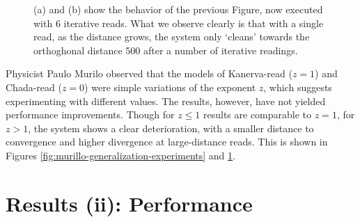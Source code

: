 \begin{figure}[h!]
  \centering


  \caption{(a) and (b) show the behavior of the previous Figure, now executed with 6 iterative reads. What we observe clearly is that with a single read, as the distance grows, the system only `cleans' towards the orthoghonal distance 500 after a number of iterative readings.}
  \label{fig:murillo-generalization-experiments-6reads}
\end{figure}



Physicist Paulo Murilo observed that the models of Kanerva-read ($z=1$) and Chada-read ($z=0$) were simple variations of the exponent $z$, which suggests experimenting with different values. The results, however, have not yielded performance improvements.  Though for $z \leq 1$ results are comparable to $z=1$, for $z>1$, the system shows a clear deterioration, with a smaller distance to convergence and higher divergence at large-distance reads. This is shown in Figures \ref{fig:murillo-generalization-experiments} and \ref{fig:murillo-generalization-experiments-6reads}.



\chapter{Results (ii): Performance}

